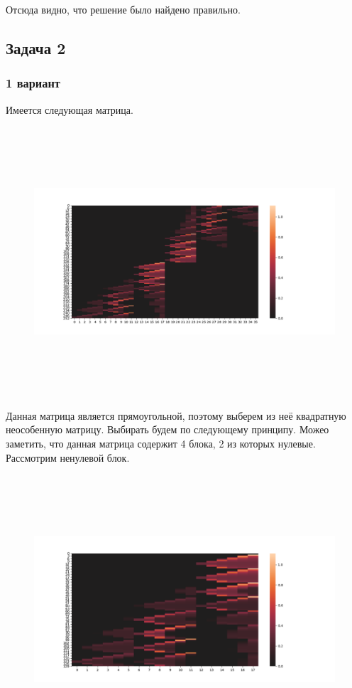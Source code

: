 \documentclass[12pt,a4paper]{scrartcl}
\begin{document}
Отсюда видно, что решение было найдено правильно.

\subsection{Задача 2}
\subsubsection{1 вариант}
Имеется следующая матрица.

\begin{figure}[H]
    \centering
    \includegraphics[width=14cm, height=10cm]{fig/matrix_1.png}
\end{figure}

Данная матрица является прямоугольной, поэтому выберем из неё квадратную неособенную матрицу. Выбирать будем по следующему принципу. Можео заметить, что данная матрица содержит 4 блока, 2 из которых нулевые. Рассмотрим ненулевой блок.

\begin{figure}[H]
    \centering
    \includegraphics[width=14cm, height=10cm]{fig/matrix_1_nonzero.png}
\end{figure}
\end{document}

